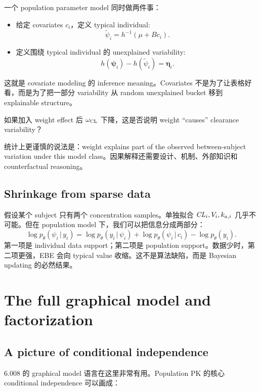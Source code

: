\documentclass[a4paper]{article}
\newcommand{\rpsi}{\boldsymbol{\psi}}
\newcommand{\reta}{\boldsymbol{\eta}}
\newcommand{\given}{\,|\,}
\begin{document}
一个 population parameter model 同时做两件事：

\begin{itemize}[leftmargin=2em]
  \item 给定 covariates \(c_i\)，定义 typical individual:
  \[
    \widetilde\psi_i = h^{-1}(\mu+Bc_i).
  \]
  \item 定义围绕 typical individual 的 unexplained variability:
  \[
    h(\rpsi_i)-h(\widetilde\psi_i)=\reta_i.
  \]
\end{itemize}

这就是 covariate modeling 的 inference meaning。Covariates 不是为了让表格好看，而是为了把一部分 variability 从 random unexplained bucket 移到 explainable structure。

\begin{question}
  如果加入 weight effect 后 \(\omega_{\mathrm{CL}}\) 下降，这是否说明 weight ``causes'' clearance variability？
\end{question}

统计上更谨慎的说法是：weight explains part of the observed between-subject variation under this model class。因果解释还需要设计、机制、外部知识和 counterfactual reasoning。

\subsection{Shrinkage from sparse data}

假设某个 subject 只有两个 concentration samples。单独拟合 \(\pksym{CL}_i,V_i,k_{a,i}\) 几乎不可能。但在 population model 下，我们可以把信息分成两部分：
\[
  \log p_\theta(\psi_i\given y_i)
  =
  \log p_\theta(y_i\given \psi_i)
  +
  \log p_\theta(\psi_i\given c_i)
  -
  \log p_\theta(y_i).
\]
第一项是 individual data support；第二项是 population support。数据少时，第二项更强，EBE 会向 typical value 收缩。这不是算法缺陷，而是 Bayesian updating 的必然结果。

\section{The full graphical model and factorization}

\subsection{A picture of conditional independence}

6.008 的 graphical model 语言在这里非常有用。Population PK 的核心 conditional independence 可以画成：
\end{document}
